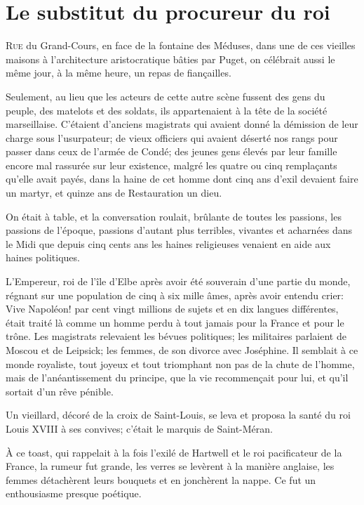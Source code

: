 \chapter{Le substitut du procureur du roi}

\lettrine{R}{ue} du Grand-Cours, en face de la fontaine des Méduses, dans une de ces vieilles maisons à l'architecture aristocratique bâties par Puget, on célébrait aussi le même jour, à la même heure, un repas de fiançailles.

Seulement, au lieu que les acteurs de cette autre scène fussent des gens du peuple, des matelots et des soldats, ils appartenaient à la tête de la société marseillaise. C'étaient d'anciens magistrats qui avaient donné la démission de leur charge sous l'usurpateur; de vieux officiers qui avaient déserté nos rangs pour passer dans ceux de l'armée de Condé; des jeunes gens élevés par leur famille encore mal rassurée sur leur existence, malgré les quatre ou cinq remplaçants qu'elle avait payés, dans la haine de cet homme dont cinq ans d'exil devaient faire un martyr, et quinze ans de Restauration un dieu.

On était à table, et la conversation roulait, brûlante de toutes les passions, les passions de l'époque, passions d'autant plus terribles, vivantes et acharnées dans le Midi que depuis cinq cents ans les haines religieuses venaient en aide aux haines politiques.

L'Empereur, roi de l'île d'Elbe après avoir été souverain d'une partie du monde, régnant sur une population de cinq à six mille âmes, après avoir entendu crier: Vive Napoléon! par cent vingt millions de sujets et en dix langues différentes, était traité là comme un homme perdu à tout jamais pour la France et pour le trône. Les magistrats relevaient les bévues politiques; les militaires parlaient de Moscou et de Leipsick; les femmes, de son divorce avec Joséphine. Il semblait à ce monde royaliste, tout joyeux et tout triomphant non pas de la chute de l'homme, mais de l'anéantissement du principe, que la vie recommençait pour lui, et qu'il sortait d'un rêve pénible.

Un vieillard, décoré de la croix de Saint-Louis, se leva et proposa la santé du roi Louis XVIII à ses convives; c'était le marquis de Saint-Méran.

À ce toast, qui rappelait à la fois l'exilé de Hartwell et le roi pacificateur de la France, la rumeur fut grande, les verres se levèrent à la manière anglaise, les femmes détachèrent leurs bouquets et en jonchèrent la nappe. Ce fut un enthousiasme presque poétique.

